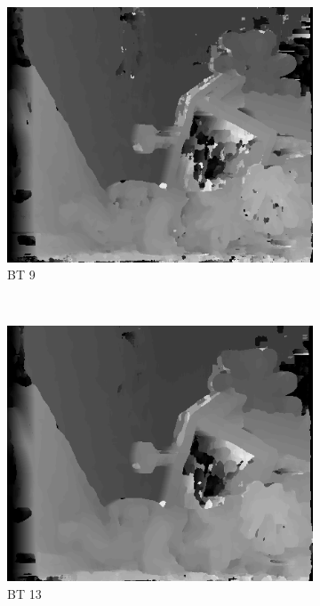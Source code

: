 \begin{figure}
  \begin{subfigure}[b]{0.23\textwidth}
    \centering
    \includegraphics[width=\textwidth]{images/stereo-pairs/teddy_bt_9.png}
    \caption{BT 9}
  \end{subfigure}
  ~
  \begin{subfigure}[b]{0.23\textwidth}
    \centering
    \includegraphics[width=\textwidth]{images/stereo-pairs/teddy_bt_13.png}
    \caption{BT 13}
  \end{subfigure}
  ~
  \begin{subfigure}[b]{0.23\textwidth}

\end{subfigure}
\end{figure}
